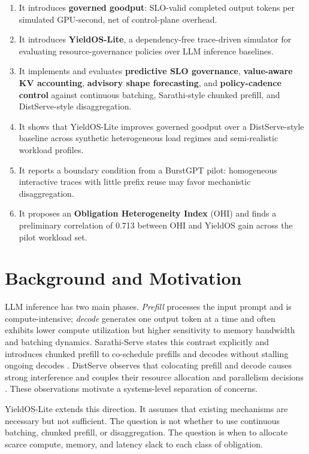 \documentclass[11pt]{article}
\begin{document}
\begin{enumerate}
  \item It introduces \textbf{governed goodput}: SLO-valid completed output tokens per simulated GPU-second, net of control-plane overhead.
  \item It introduces \textbf{YieldOS-Lite}, a dependency-free trace-driven simulator for evaluating resource-governance policies over LLM inference baselines.
  \item It implements and evaluates \textbf{predictive SLO governance}, \textbf{value-aware KV accounting}, \textbf{advisory shape forecasting}, and \textbf{policy-cadence control} against continuous batching, Sarathi-style chunked prefill, and DistServe-style disaggregation.
  \item It shows that YieldOS-Lite improves governed goodput over a DistServe-style baseline across synthetic heterogeneous load regimes and semi-realistic workload profiles.
  \item It reports a boundary condition from a BurstGPT pilot: homogeneous interactive traces with little prefix reuse may favor mechanistic disaggregation.
  \item It proposes an \textbf{Obligation Heterogeneity Index} (OHI) and finds a preliminary correlation of 0.713 between OHI and YieldOS gain across the pilot workload set.
\end{enumerate}

\section{Background and Motivation}

LLM inference has two main phases. \emph{Prefill} processes the input prompt and is compute-intensive; \emph{decode} generates one output token at a time and often exhibits lower compute utilization but higher sensitivity to memory bandwidth and batching dynamics. Sarathi-Serve states this contrast explicitly and introduces chunked prefill to co-schedule prefills and decodes without stalling ongoing decodes \cite{sarathi}. DistServe observes that colocating prefill and decode causes strong interference and couples their resource allocation and parallelism decisions \cite{distserve}. These observations motivate a systems-level separation of concerns.

YieldOS-Lite extends this direction. It assumes that existing mechanisms are necessary but not sufficient. The question is not whether to use continuous batching, chunked prefill, or disaggregation. The question is when to allocate scarce compute, memory, and latency slack to each class of obligation.
\end{document}

